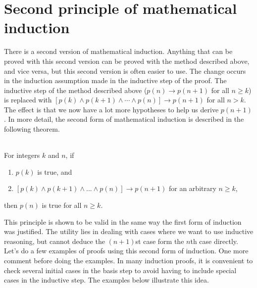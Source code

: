 \section{Second principle of mathematical induction}
There is a second version of mathematical induction. Anything that can be proved
with this second version can be proved with the method described above, and vice versa,
but this second version is often easier to use. The change occurs in the induction
assumption made in the inductive step of the proof.
The inductive step of the method described above ($p(n)\to p(n+1)$ for all $n\geq k$)
is replaced with
$[p(k)\land p(k+1)\land \cdots\land p(n)]\to p(n+1)$ for all $n>k$. The effect is that
we now have a lot more hypotheses to help us derive $p(n+1)$.
In more detail, the second form of mathematical induction is described in the following theorem.
\ms
\begin{thm}
\  \\
 For integers $k$ and $n$, if
 \begin{enumerate}
   \item $p(k)$ is true, and
   \item $[p(k)\land p(k+1)\land ...\land p(n)]\to p(n+1)$ for an arbitrary $n\geq k$,
 \end{enumerate}
 then $p(n)$ is true for all $n\geq k$.
\end{thm}

This principle is shown to be valid in the same way the first form of induction was justified.
The utility lies in dealing with cases where we want to use inductive reasoning,
but cannot deduce the $(n+1)$st case form the $n$th case directly. Let's do  a few
 examples
of proofs using this second form of induction. One more comment before doing the examples.
In many induction proofs, it is convenient to check several initial cases in the basis step to
avoid having to include special cases in the inductive step. The examples below illustrate
this idea.
\ms


